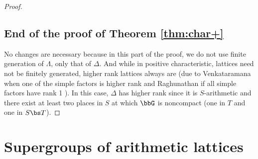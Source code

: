 \begin{proof}
\subsection{End of the proof of Theorem \ref{thm:char+}} No changes are necessary because in this part of the proof, we do not use finite generation of $\Lambda$, only that of $\Delta$. And while in positive characteristic, lattices need not be finitely generated, higher rank lattices always are (due to Venkataramana when one of the simple factors is higher rank \cite{venky-thesis} and Raghunathan if all simple factors have rank 1 \cite{raghunathan-fg}). In this case, $\Delta$ has higher rank since it is $S$-arithmetic and there exist at least two places in $S$ at which $\bbG$ is noncompact (one in $T$ and one in $S\bs T$). \end{proof}

\section{Supergroups of arithmetic lattices}
\label{sec:venky}

